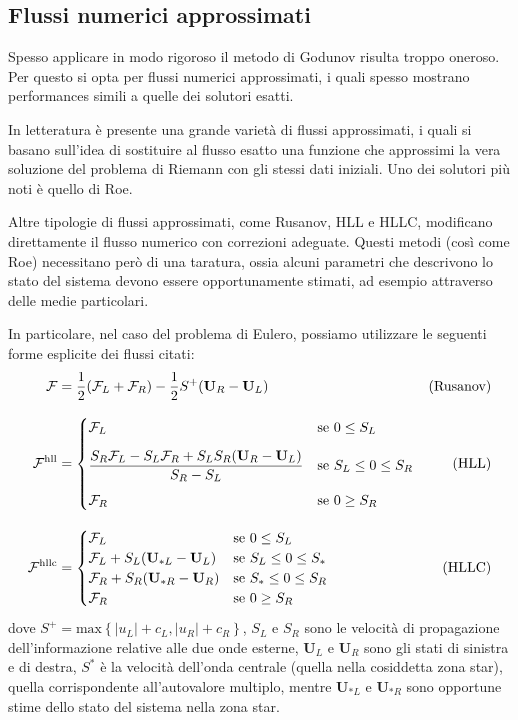 \subsection{Flussi numerici approssimati}
Spesso applicare in modo rigoroso il metodo di Godunov risulta troppo oneroso. Per questo si opta per flussi numerici approssimati, i quali spesso mostrano performances simili a quelle dei solutori esatti.

In letteratura è presente una grande varietà di flussi approssimati, i quali si basano sull'idea di sostituire al flusso esatto una funzione che approssimi la vera soluzione del problema di Riemann con gli stessi dati iniziali. Uno dei solutori più noti è quello di Roe.

Altre tipologie di flussi approssimati, come Rusanov, HLL e HLLC, modificano direttamente il flusso numerico con correzioni adeguate. Questi metodi (così come Roe) necessitano però di una taratura, ossia alcuni parametri che descrivono lo stato del sistema devono essere opportunamente stimati, ad esempio attraverso delle medie particolari.

In particolare, nel caso del problema di Eulero, possiamo utilizzare le seguenti forme esplicite dei flussi citati:
\begin{align*}
\mathbf{\mathcal{F}} &= \frac{1}{2}(\mathbf{\mathcal{F}}_L + \mathbf{\mathcal{F}}_R) - \frac{1}{2} S^+ (\textbf{U}_R - \textbf{U}_L) & \text{(Rusanov)} \\[2ex]
\mathbf{\mathcal{F}}^{\text{hll}} &= 
\begin{cases}
\mathbf{\mathcal{F}}_L & \text{se $0 \leq S_L$} \\[2ex]
\dfrac{S_R\mathbf{\mathcal{F}}_L - S_L\mathbf{\mathcal{F}}_R + S_L S_R (\textbf{U}_R -\textbf{U}_L)}{S_R - S_L} & \text{se $S_L \leq 0 \leq  S_R$} \\[2.5ex]
\mathbf{\mathcal{F}}_R & \text{se $0 \geq S_R$}
\end{cases} & \text{(HLL)} \\[2ex]
\mathbf{\mathcal{F}}^{\text{hllc}} &= 
\begin{cases}
\mathbf{\mathcal{F}}_L & \text{se $0 \leq S_L$} \\
\mathbf{\mathcal{F}}_L + S_L (\textbf{U}_{*L} - \textbf{U}_L ) & \text{se $S_L \leq 0 \leq S_*$}\\
\mathbf{\mathcal{F}}_R + S_R (\textbf{U}_{*R} - \textbf{U}_R ) & \text{se $S_* \leq 0 \leq S_R$}\\
\mathbf{\mathcal{F}}_R & \text{se $0 \geq S_R$}
\end{cases} & \text{(HLLC)}
\end{align*}
dove $S^+ = \text{max} \left\{\left|u_L\right| + c_L, \left|u_R\right| + c_R \right\}$, $S_L$ e $S_R$ sono le velocità di propagazione dell'informazione relative alle due onde esterne, $\textbf{U}_L$ e $\textbf{U}_R$ sono gli stati di sinistra e di destra, $S^*$ è la velocità dell'onda centrale (quella nella cosiddetta zona star), quella corrispondente all'autovalore multiplo, mentre $\textbf{U}_{*L}$ e $\textbf{U}_{*R}$ sono opportune stime dello stato del sistema nella zona star.

